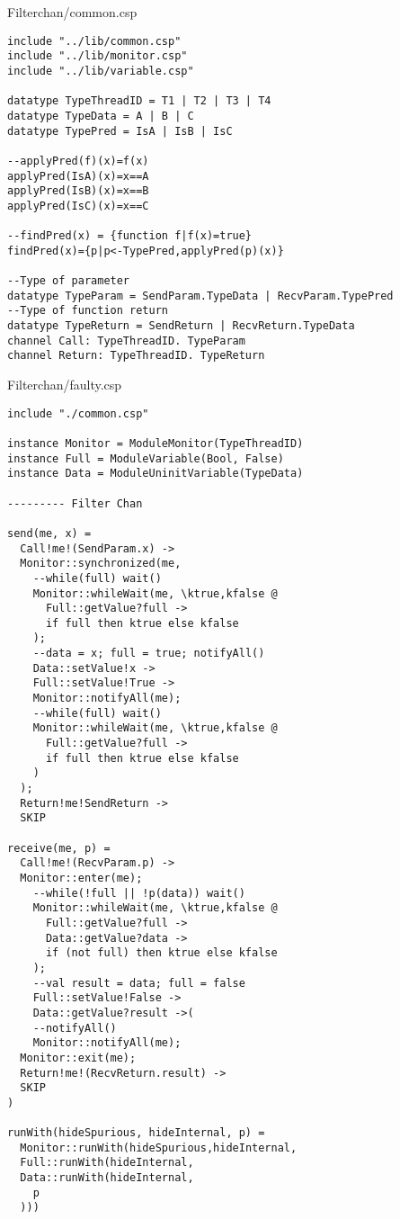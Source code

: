 Filterchan/common.csp
\begin{lstlisting}
include "../lib/common.csp"
include "../lib/monitor.csp"
include "../lib/variable.csp"

datatype TypeThreadID = T1 | T2 | T3 | T4
datatype TypeData = A | B | C
datatype TypePred = IsA | IsB | IsC

--applyPred(f)(x)=f(x)
applyPred(IsA)(x)=x==A
applyPred(IsB)(x)=x==B
applyPred(IsC)(x)=x==C

--findPred(x) = {function f|f(x)=true} 
findPred(x)={p|p<-TypePred,applyPred(p)(x)}

--Type of parameter
datatype TypeParam = SendParam.TypeData | RecvParam.TypePred
--Type of function return
datatype TypeReturn = SendReturn | RecvReturn.TypeData
channel Call: TypeThreadID. TypeParam
channel Return: TypeThreadID. TypeReturn

\end{lstlisting}
Filterchan/faulty.csp
\begin{lstlisting}
include "./common.csp"

instance Monitor = ModuleMonitor(TypeThreadID)
instance Full = ModuleVariable(Bool, False)
instance Data = ModuleUninitVariable(TypeData)

--------- Filter Chan

send(me, x) = 
  Call!me!(SendParam.x) ->
  Monitor::synchronized(me,
    --while(full) wait()
    Monitor::whileWait(me, \ktrue,kfalse @
      Full::getValue?full ->
      if full then ktrue else kfalse
    );
    --data = x; full = true; notifyAll()
    Data::setValue!x ->
    Full::setValue!True ->
    Monitor::notifyAll(me);
    --while(full) wait()
    Monitor::whileWait(me, \ktrue,kfalse @
      Full::getValue?full ->
      if full then ktrue else kfalse
    )
  );
  Return!me!SendReturn ->
  SKIP

receive(me, p) = 
  Call!me!(RecvParam.p) ->
  Monitor::enter(me);
    --while(!full || !p(data)) wait()
    Monitor::whileWait(me, \ktrue,kfalse @
      Full::getValue?full ->
      Data::getValue?data ->
      if (not full) then ktrue else kfalse
    );
    --val result = data; full = false
    Full::setValue!False ->
    Data::getValue?result ->(
    --notifyAll()
    Monitor::notifyAll(me);
  Monitor::exit(me);
  Return!me!(RecvReturn.result) ->
  SKIP
)

runWith(hideSpurious, hideInternal, p) =
  Monitor::runWith(hideSpurious,hideInternal,
  Full::runWith(hideInternal,
  Data::runWith(hideInternal,
    p
  )))
\end{lstlisting}
